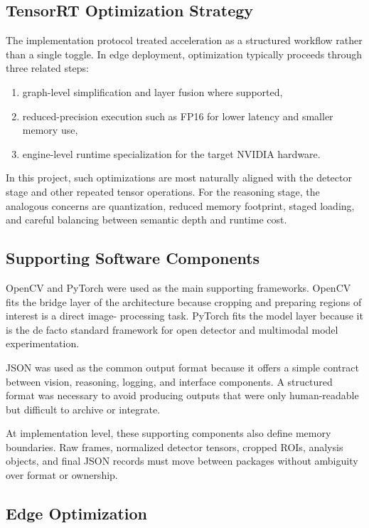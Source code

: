 \subsection{TensorRT Optimization Strategy}

The implementation protocol treated acceleration as a structured workflow rather than a single
toggle. In edge deployment, optimization typically proceeds through three related steps:

\begin{enumerate}[nosep]
  \item graph-level simplification and layer fusion where supported,
  \item reduced-precision execution such as FP16 for lower latency and smaller memory use,
  \item engine-level runtime specialization for the target NVIDIA hardware.
\end{enumerate}

In this project, such optimizations are most naturally aligned with the detector stage and other
repeated tensor operations. For the reasoning stage, the analogous concerns are quantization,
reduced memory footprint, staged loading, and careful balancing between semantic depth and
runtime cost.

\subsection{Supporting Software Components}

OpenCV and PyTorch were used as the main supporting frameworks. OpenCV fits the bridge
layer of the architecture because cropping and preparing regions of interest is a direct image-
processing task. PyTorch fits the model layer because it is the de facto standard framework
for open detector and multimodal model experimentation.

JSON was used as the common output format because it offers a simple contract between
vision, reasoning, logging, and interface components. A structured format was necessary to
avoid producing outputs that were only human-readable but difficult to archive or integrate.

At implementation level, these supporting components also define memory boundaries. Raw
frames, normalized detector tensors, cropped ROIs, analysis objects, and final JSON records
must move between packages without ambiguity over format or ownership.

\subsection{Edge Optimization}

